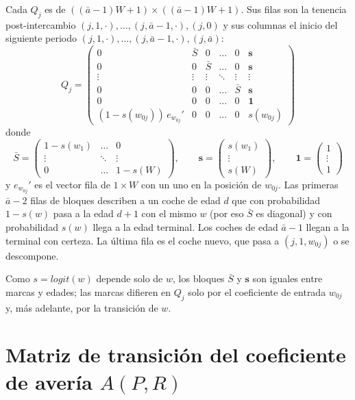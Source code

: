 \documentclass{article}
\begin{document}
Cada $Q_j$ es de $((\bar{a}-1)W+1)\times((\bar{a}-1)W+1)$. Sus filas son la tenencia post-intercambio $(j,1,\cdot),\dots,(j,\bar{a}-1,\cdot),(j,0)$ y sus columnas el inicio del siguiente periodo $(j,1,\cdot),\dots,(j,\bar{a}-1,\cdot),(j,\bar{a})$:
$$
Q_j=\begin{pmatrix}
    0 & \bar{S} & 0 & \dots & 0 & \mathbf{s} \\
    0 & 0 & \bar{S} & \dots & 0 & \mathbf{s} \\
    \vdots & \vdots & \vdots & \ddots & \vdots & \vdots \\
    0 & 0 & 0 & \dots & \bar{S} & \mathbf{s} \\
    0 & 0 & 0 & \dots & 0 & \mathbf{1} \\
    (1-s(w_{0j}))\,e_{w_{0j}}' & 0 & 0 & \dots & 0 & s(w_{0j})
\end{pmatrix}
$$
donde
$$
\bar{S}=\begin{pmatrix}
   1-s(w_1) & \dots & 0 \\
   \vdots & \ddots & \vdots \\
   0 & \dots & 1-s(W)
\end{pmatrix},
\qquad
\mathbf{s}=\begin{pmatrix} s(w_1)\\ \vdots \\ s(W)\end{pmatrix},
\qquad
\mathbf{1}=\begin{pmatrix} 1\\ \vdots \\ 1\end{pmatrix}
$$
y $e_{w_{0j}}'$ es el vector fila de $1\times W$ con un uno en la posición de $w_{0j}$. Las primeras $\bar{a}-2$ filas de bloques describen a un coche de edad $d$ que con probabilidad $1-s(w)$ pasa a la edad $d+1$ con el mismo $w$ (por eso $\bar{S}$ es diagonal) y con probabilidad $s(w)$ llega a la edad terminal. Los coches de edad $\bar{a}-1$ llegan a la terminal con certeza. La última fila es el coche nuevo, que pasa a $(j,1,w_{0j})$ o se descompone.

Como $s=logit(w)$ depende solo de $w$, los bloques $\bar{S}$ y $\mathbf{s}$ son iguales entre marcas y edades; las marcas difieren en $Q_j$ solo por el coeficiente de entrada $w_{0j}$ y, más adelante, por la transición de $w$.

\section*{Matriz de transición del coeficiente de avería $A(P,R)$}
\end{document}
